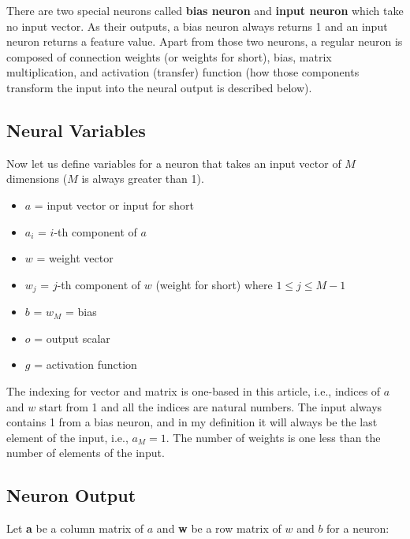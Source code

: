 \documentclass[letterpaper, 11pt]{article}
\numberwithin{equation}{section}
\numberwithin{figure}{section}
\numberwithin{table}{section}
\begin{document}
There are two special neurons called \textbf{bias neuron} and \textbf{input neuron} which take no input vector. As their outputs, a bias neuron always returns 1 and an input neuron returns a feature value. Apart from those two neurons, a regular neuron is composed of connection weights (or weights for short), bias, matrix multiplication, and activation (transfer) function (how those components transform the input into the neural output is described below).

\subsection{Neural Variables}
Now let us define variables for a neuron that takes an input vector of \(M\) dimensions (\(M\) is always greater than 1).

\begin{itemize}
	\item \(a\) = input vector or input for short
	\item \(a_{i}\) = \(i\)-th component of \(a\)
	\item \(w\) = weight vector
	\item \(w_{j}\) = \(j\)-th component of \(w\) (weight for short) where \(1 \le j \le M - 1\)
	\item \(b\) = \(w_{M}\) = bias
	\item \(o\) = output scalar
	\item \(g\) = activation function
\end{itemize}

The indexing for vector and matrix is one-based in this article, i.e., indices of \(a\) and \(w\) start from 1 and all the indices are natural numbers. The input always contains 1 from a bias neuron, and in my definition it will always be the last element of the input, i.e., \(a_{M} = 1\).  The number of weights is one less than the number of elements of the input. 

\subsection{Neuron Output}
Let \textbf{a} be a column matrix of \(a\) and \textbf{w} be a row matrix of \(w\) and \(b\) for a neuron: 
\end{document}
